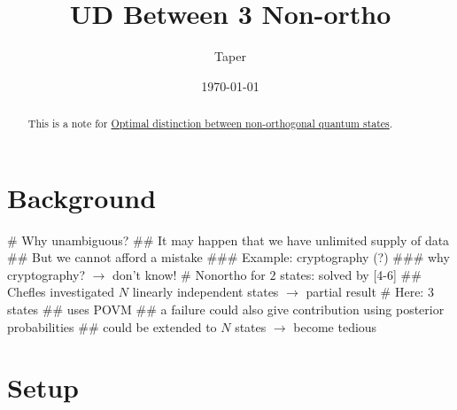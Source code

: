 \documentclass{article}
\title{UD Between 3 Non-ortho}
\date{\today}
\author{Taper}
\begin{document}
\maketitle

\begin{abstract}
This is a note for \href{https://arxiv.org/abs/quant-ph/9804031}{Optimal distinction between non-orthogonal quantum states}.
\end{abstract}

\section{Background}

\begin{easylist}[enumerate]
# Why unambiguous?
## It may happen that we have unlimited supply of data
## But we cannot afford a mistake
### Example: cryptography (?)
### why cryptography? $\to$ {\color{red} don't know!}
# Nonortho for $2$ states: solved by [4-6]
## Chefles investigated $N$ linearly independent states $\to$ partial result
# Here: $3$ states
## uses POVM
## a failure could also give contribution using posterior probabilities
## could be extended to $N$ states $\to$ become tedious
\end{easylist}

\section{Setup}
\end{document}
